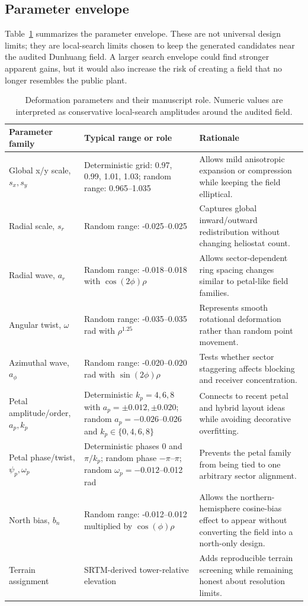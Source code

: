 \documentclass[final,3p,times]{elsarticle}
\begin{document}
\subsection{Parameter envelope}
Table~\ref{tab:param-envelope} summarizes the parameter envelope. These are not universal design limits; they are local-search limits chosen to keep the generated candidates near the audited Dunhuang field. A larger search envelope could find stronger apparent gains, but it would also increase the risk of creating a field that no longer resembles the public plant.

\begin{longtable}{p{}p{}p{}}
\caption{Deformation parameters and their manuscript role. Numeric values are interpreted as conservative local-search amplitudes around the audited field.} \label{tab:param-envelope}\\
\toprule
Parameter family & Typical range or role & Rationale \\
\midrule
Global x/y scale, $s_x,s_y$ & Deterministic grid: 0.97, 0.99, 1.01, 1.03; random range: 0.965--1.035 & Allows mild anisotropic expansion or compression while keeping the field elliptical. \\
Radial scale, $s_r$ & Random range: -0.025--0.025 & Captures global inward/outward redistribution without changing heliostat count. \\
Radial wave, $a_r$ & Random range: -0.018--0.018 with $\cos(2\phi)\rho$ & Allows sector-dependent ring spacing changes similar to petal-like field families. \\
Angular twist, $\omega$ & Random range: -0.035--0.035 rad with $\rho^{1.25}$ & Represents smooth rotational deformation rather than random point movement. \\
Azimuthal wave, $a_\phi$ & Random range: -0.020--0.020 rad with $\sin(2\phi)\rho$ & Tests whether sector staggering affects blocking and receiver concentration. \\
Petal amplitude/order, $a_p,k_p$ & Deterministic $k_p=4,6,8$ with $a_p=\pm0.012,\pm0.020$; random $a_p=-0.026$--0.026 and $k_p\in\{0,4,6,8\}$ & Connects to recent petal and hybrid layout ideas while avoiding decorative overfitting. \\
Petal phase/twist, $\psi_p,\omega_p$ & Deterministic phases 0 and $\pi/k_p$; random phase $-\pi$--$\pi$; random $\omega_p=-0.012$--0.012 rad & Prevents the petal family from being tied to one arbitrary sector alignment. \\
North bias, $b_n$ & Random range: -0.012--0.012 multiplied by $\cos(\phi)\rho$ & Allows the northern-hemisphere cosine-bias effect to appear without converting the field into a north-only design. \\
Terrain assignment & SRTM-derived tower-relative elevation & Adds reproducible terrain screening while remaining honest about resolution limits. \\
\bottomrule
\end{longtable}
\end{document}
